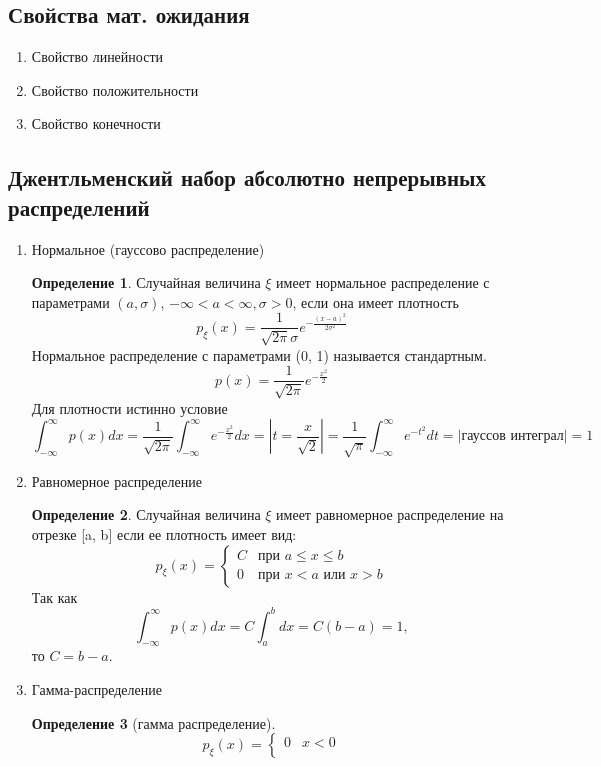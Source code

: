 \documentclass[a4paper]{article}
\theoremstyle{definition}
\newtheorem*{definition}{Определение}
\theoremstyle{remark}
\begin{document}
\subsection{Свойства мат. ожидания}
\begin{enumerate}
    \item Свойство линейности
    \item Свойство положительности
    \item Свойство конечности
\end{enumerate}
\subsection{Джентльменский набор абсолютно непрерывных распределений}
\begin{enumerate}
    \item Нормальное (гауссово распределение)
    \begin{definition}
        Случайная величина $\xi$ имеет нормальное распределение с параметрами $(a, \sigma)$, $-\infty < a < \infty, \sigma > 0$, если она имеет плотность
        \[p_\xi(x) = \frac1{\sqrt{2\pi}\sigma} e^{-\frac{(x-a)^2}{2\sigma^2}}\]
        Нормальное распределение с параметрами (0, 1) называется стандартным.
        \[p(x) = \frac1{\sqrt{2\pi}}e^{-\frac{x^2}2}\]
        Для плотности истинно условие
        \[\int_{-\infty}^{\infty}p(x) dx = \frac1{\sqrt{2\pi}} \int_{-\infty}^{\infty} e^{-\frac{x^2}2}dx = |t = \frac{x}{\sqrt{2}}|= \frac1{\sqrt{\pi}} \int_{-\infty}^{\infty}  e^{-t^2}dt = |\text{гауссов интеграл}| = 1\]
    \end{definition}
    \item Равномерное распределение
    \begin{definition}
        Случайная величина $\xi$ имеет равномерное распределение на отрезке [a, b] если ее плотность имеет вид:
        \[p_\xi (x) = \begin{cases}
            C & \text{при } a \le x \le b \\
            0 &\text{при } x < a \text{ или } x > b
        \end{cases}\]
        Так как 
        \[\int_{-\infty}^{\infty}p(x) dx = C \int_{a}^{b}dx = C(b-a) = 1,\]
        то $C = b - a.$
    \end{definition}
    \item Гамма-распределение 
    \begin{definition}[гамма распределение]
        \[p_\xi (x) = \begin{cases}
            0 & x< 0 \\

\end{cases}\]
\end{definition}
\end{enumerate}
\end{document}
